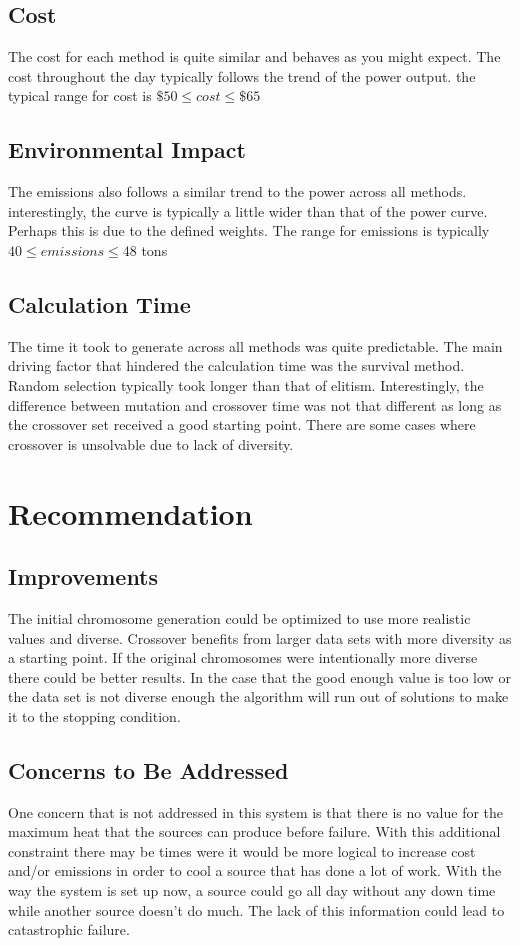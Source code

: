 \documentclass[conference]{IEEEtran}
\begin{document}
    \subsection{Cost}
    The cost for each method is quite similar and behaves as you might expect.  The cost throughout the day typically follows the trend of the power output.
    the typical range for cost is \(\$50 \leq cost \leq \$65\)

    \subsection{Environmental Impact}
    The emissions also follows a similar trend to the power across all methods.  interestingly, the curve is typically a little wider than that of the power curve. Perhaps this is due to the defined weights. The range for emissions is typically \(40 \leq emissions \leq 48 \) tons

    \subsection{Calculation Time}
    The time it took to generate across all methods was quite predictable.  
    The main driving factor that hindered the calculation time was the survival method.  Random selection typically took longer than that of elitism.  Interestingly, the difference between mutation and crossover time was not that different as long as the crossover set received a good starting point. There are some cases where crossover is unsolvable due to lack of diversity.

    \section{Recommendation}

    \subsection{Improvements}
    The initial chromosome generation could be optimized to use more realistic values and diverse.  Crossover benefits from larger data sets with more diversity as a starting point.  If the original chromosomes were intentionally more diverse there could be better results.  In the case that the good enough value is too low or the data set is not diverse enough the algorithm will run out of solutions to make it to the stopping condition.


    \subsection{Concerns to Be Addressed}
    One concern that is not addressed in this system is that there is no value for the maximum heat that the sources can produce before failure.  With this additional constraint there may be times were it would be more logical to increase cost and/or emissions in order to cool a source that has done a lot of work.  With the way the system is set up now, a source could go all day without any down time while another source doesn't do much.  The lack of this information could lead to catastrophic failure.
\end{document}
